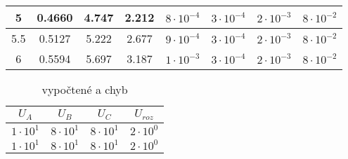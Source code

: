 \documentclass{article}
\begin{document}
\begin{table}[H]
\begin{tabular}{|c|c|c|c|c|c|c|c|}
        5	            & 0.4660	   &    4.747	   & 2.212                  & \(8\cdot10^{-4}\)       & \(3\cdot10^{-4}\)     & \(2\cdot10^{-3}\)     & \(8\cdot10^{-2}\)     \\ \hline
        5.5	          & 0.5127	   &    5.222	   & 2.677                  & \(9\cdot10^{-4}\)       & \(3\cdot10^{-4}\)     & \(2\cdot10^{-3}\)     & \(8\cdot10^{-2}\)     \\ \hline
        6	            & 0.5594	   &    5.697	   & 3.187                  & \(1\cdot10^{-3}\)       & \(3\cdot10^{-4}\)     & \(2\cdot10^{-3}\)     & \(8\cdot10^{-2}\)     \\ \hline
    \end{tabular}
\end{table}


\begin{table}[H]
    \caption{\label{tabulka_mereni} vypočtené a chyb}
    \centering
    \begin{tabular}{|c|c|c|c|}
        \hline
        \(U_A\)        & \(U_B\)        & \(U_C\)        & \(U_{roz}\)    \\ \hline
        \(1\cdot10^1\) & \(8\cdot10^1\) & \(8\cdot10^1\) & \(2\cdot10^0\) \\ \hline
        \(1\cdot10^1\) & \(8\cdot10^1\) & \(8\cdot10^1\) & \(2\cdot10^0\) \\ \hline
    \end{tabular}
\end{table}
\end{document}

